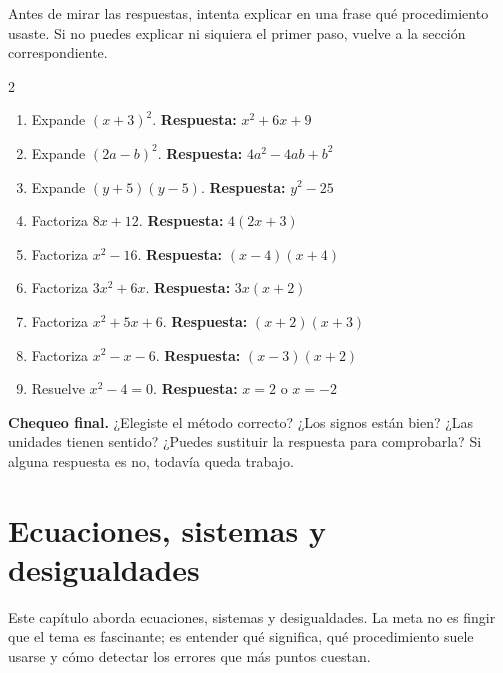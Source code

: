 \documentclass[10pt,oneside,openany]{book}
\begin{document}
Antes de mirar las respuestas, intenta explicar en una frase qué procedimiento usaste. Si no puedes explicar ni siquiera el primer paso, vuelve a la sección correspondiente.

\begin{multicols}{2}\begin{enumerate}

\item Expande $(x+3)^2$. \textbf{Respuesta:} $x^2+6x+9$

\item Expande $(2a-b)^2$. \textbf{Respuesta:} $4a^2-4ab+b^2$

\item Expande $(y+5)(y-5)$. \textbf{Respuesta:} $y^2-25$

\item Factoriza $8x+12$. \textbf{Respuesta:} $4(2x+3)$

\item Factoriza $x^2-16$. \textbf{Respuesta:} $(x-4)(x+4)$

\item Factoriza $3x^2+6x$. \textbf{Respuesta:} $3x(x+2)$

\item Factoriza $x^2+5x+6$. \textbf{Respuesta:} $(x+2)(x+3)$

\item Factoriza $x^2-x-6$. \textbf{Respuesta:} $(x-3)(x+2)$

\item Resuelve $x^2-4=0$. \textbf{Respuesta:} $x=2$ o $x=-2$

\end{enumerate}\end{multicols}

\begin{idea}\textbf{Chequeo final.} ¿Elegiste el método correcto? ¿Los signos están bien? ¿Las unidades tienen sentido? ¿Puedes sustituir la respuesta para comprobarla? Si alguna respuesta es no, todavía queda trabajo.\end{idea}



\chapter{Ecuaciones, sistemas y desigualdades}

\begin{idea}
Este capítulo aborda ecuaciones, sistemas y desigualdades. La meta no es fingir que el tema es fascinante; es entender qué significa, qué procedimiento suele usarse y cómo detectar los errores que más puntos cuestan.
\end{idea}
\end{document}
